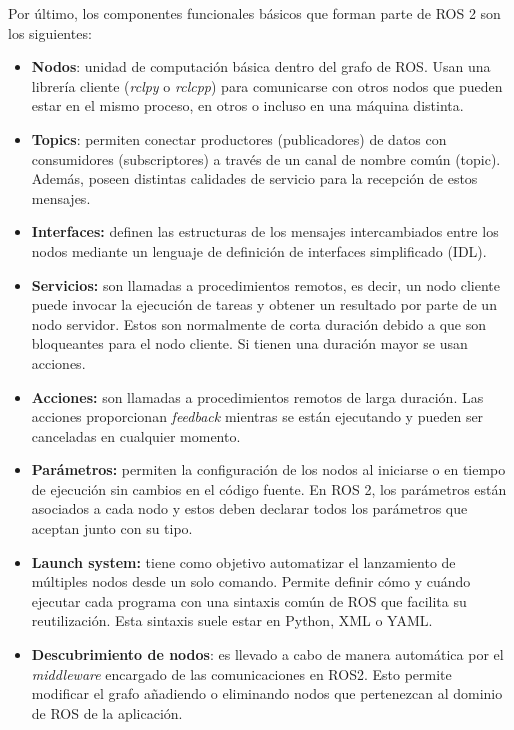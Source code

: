 Por último, los componentes funcionales básicos que forman parte de ROS 2 son los siguientes:

\begin{itemize}
    \item \textbf{Nodos}: unidad de computación básica dentro del grafo de ROS. Usan una librería cliente (\textit{rclpy} o \textit{rclcpp}) para comunicarse con otros nodos que pueden estar en el mismo proceso, en otros o incluso en una máquina distinta.

    \item \textbf{Topics}: permiten conectar productores (publicadores) de datos con consumidores (subscriptores) a través de un canal de nombre común (topic). Además, poseen distintas calidades de servicio para la recepción de estos mensajes.

    \item \textbf{Interfaces:} definen las estructuras de los mensajes intercambiados entre los nodos mediante un lenguaje de definición de interfaces simplificado (IDL). 

    \item \textbf{Servicios:} son llamadas a procedimientos remotos, es decir, un nodo cliente puede invocar la ejecución de tareas y obtener un resultado por parte de un nodo servidor. Estos son normalmente de corta duración debido a que son bloqueantes para el nodo cliente. Si tienen una duración mayor se usan acciones.
    
    \item \textbf{Acciones:} son llamadas a procedimientos remotos de larga duración. Las acciones proporcionan \textit{feedback} mientras se están ejecutando y pueden ser canceladas en cualquier momento. 

    \item \textbf{Parámetros:} permiten la configuración de los nodos al iniciarse o en tiempo de ejecución sin cambios en el código fuente. En ROS 2, los parámetros están asociados a cada nodo y estos deben declarar todos los parámetros que aceptan junto con su tipo. 

    \item \textbf{Launch system:} tiene como objetivo automatizar el lanzamiento de múltiples nodos desde un solo comando. Permite definir cómo y cuándo ejecutar cada programa con una sintaxis común de ROS que facilita su reutilización. Esta sintaxis suele estar en Python, XML o YAML.
    
    \item \textbf{Descubrimiento de nodos}: es llevado a cabo de manera automática por el \textit{middleware} encargado de las comunicaciones en ROS2. Esto permite modificar el grafo añadiendo o eliminando nodos que pertenezcan al dominio de ROS de la aplicación.
    
\end{itemize}

